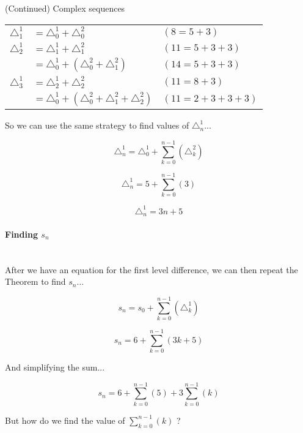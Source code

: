     \begin{intro}{(Continued) Complex sequences}
        
        \begin{center}
            \begin{tabular}{c l | l}
                $\triangle_{1}^{1}$
                &           $= \triangle_{0}^{1} + \triangle_{0}^{2}$
                & $(8 = 5 + 3)$
                \\
                $\triangle_{2}^{1}$
                &           $= \triangle_{1}^{1} + \triangle_{1}^{2}$
                & $(11 = 5 + 3 + 3)$
                \\
                &           $= \triangle_{0}^{1} + (\triangle_{0}^{2} + \triangle_{1}^{2})$
                & $(14 = 5 + 3 + 3)$
                \\
                $\triangle_{3}^{1}$
                &           $= \triangle_{2}^{1} + \triangle_{2}^{2}$
                & $(11 = 8 + 3)$
                \\
                &           $= \triangle_{0}^{1} + (\triangle_{0}^{2} + \triangle_{1}^{2} + \triangle_{2}^{2})$ & $(11 = 2 + 3 + 3 + 3)$
            \end{tabular}
    
        \end{center}

        So we can use the same strategy to find values of $\triangle_{n}^{1}$...

        $$ \triangle_{n}^{1} = \triangle_{0}^{1} + \sum_{k=0}^{n-1} ( \triangle_{k}^{2} ) $$

        $$ \triangle_{n}^{1} = 5 + \sum_{k=0}^{n-1} (3) $$

        $$ \triangle_{n}^{1} = 3n + 5 $$

        \paragraph{Finding $s_{n}$} ~\\

        After we have an equation for the first level difference, we can then repeat
        the Theorem to find $s_{n}$...

        $$ s_{n} = s_{0} + \sum_{k=0}^{n-1} ( \triangle_{k}^{1} ) $$

        $$ s_{n} = 6 + \sum_{k=0}^{n-1} (3k + 5) $$

        And simplifying the sum...
        
        $$ s_{n} = 6 + \sum_{k=0}^{n-1} (5) + 3 \sum_{k=0}^{n-1} (k) $$

        But how do we find the value of $\sum_{k=0}^{n-1} (k)$ ?
        
    \end{intro}

